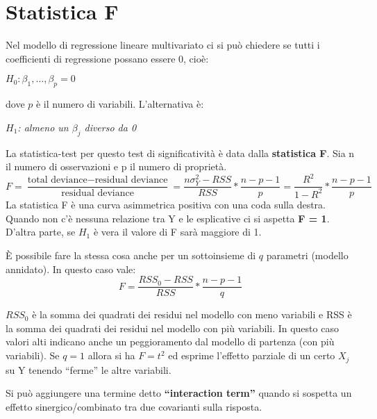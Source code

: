 \section{Statistica F}
Nel modello di regressione lineare multivariato ci si può chiedere se tutti i coefficienti di regressione possano essere 0, cioè:
\begin{center}
	$H_{0}: \beta_{1}, \dots, \beta_{p} = 0$
\end{center}
dove $p$ \`e il numero di variabili. L'alternativa \`e:
\begin{center}
	$H_{1}$\textit{: almeno un $\beta_{j}$ diverso da 0}
\end{center}
La statistica-test per questo test di significativit\`a \`e data dalla \textbf{statistica F}. Sia n il numero di osservazioni e p il numero di proprietà.
\[ F = \frac{\text{total deviance} - \text{residual deviance}}{\text{residual deviance}} = \frac{n\sigma^2_{Y} - RSS}{RSS} * \frac{n - p - 1}{p} = \frac{R^{2}}{1 - R^{2}} * \frac{n - p - 1}{p} \]
La statistica F è una curva asimmetrica positiva con una coda sulla destra.
Quando non c'\`e nessuna relazione tra Y e le esplicative ci si aspetta \textbf{F = 1}. D'altra parte, se $H_{1}$ è vera il valore di F sar\`a maggiore di 1.

È possibile fare la stessa cosa anche per un sottoinsieme di $q$ parametri (modello annidato). In questo caso vale:
\[ F = \frac{RSS_{0} - RSS}{RSS} * \frac{n - p - 1}{q} \]

$RSS_0$ è la somma dei quadrati dei residui nel modello con meno variabili e RSS è la somma dei quadrati dei residui nel modello con più variabili.
In questo caso valori alti indicano anche un peggioramento dal modello di partenza (con più variabili). Se $q = 1$ allora si ha $F=t^{2}$ ed esprime l'effetto parziale di un certo $X_{j}$ su Y tenendo ``ferme'' le altre variabili.

Si può aggiungere una termine detto \textbf{``interaction term''} quando si sospetta un effetto sinergico/combinato tra due covarianti sulla risposta.
